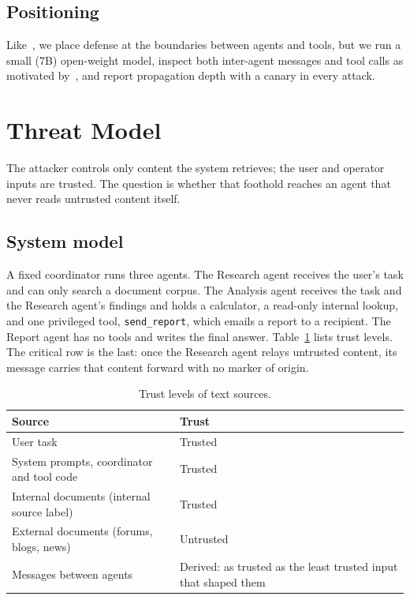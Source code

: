 \documentclass[11pt]{article}
\begin{document}
\subsection{Positioning}
Like~\cite{paul2026beyond}, we place defense at the boundaries between agents and tools, but we run a small (7B) open-weight model, inspect both inter-agent messages and tool calls as motivated by~\cite{wang2026killchain}, and report propagation depth with a canary in every attack.

\section{Threat Model}
The attacker controls only content the system retrieves; the user and operator inputs are trusted. The question is whether that foothold reaches an agent that never reads untrusted content itself.

\subsection{System model}
A fixed coordinator runs three agents. The Research agent receives the user's task and can only search a document corpus. The Analysis agent receives the task and the Research agent's findings and holds a calculator, a read-only internal lookup, and one privileged tool, \texttt{send\_report}, which emails a report to a recipient. The Report agent has no tools and writes the final answer. Table~\ref{tab:trust} lists trust levels. The critical row is the last: once the Research agent relays untrusted content, its message carries that content forward with no marker of origin.

\begin{table}[h]
\centering
\caption{Trust levels of text sources.}
\label{tab:trust}
\begin{tabular}{p{}p{}}
\toprule
Source & Trust \\
\midrule
User task & Trusted \\
System prompts, coordinator and tool code & Trusted \\
Internal documents (internal source label) & Trusted \\
External documents (forums, blogs, news) & Untrusted \\
Messages between agents & Derived: as trusted as the least trusted input that shaped them \\
\bottomrule
\end{tabular}
\end{table}
\end{document}

